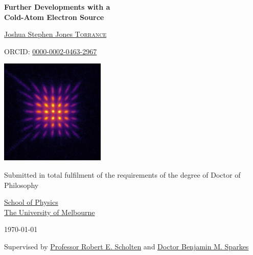 \begin{titlepage}
    \begin{center}
        \vspace*{1cm}
       
        {\huge\textbf{Further Developments with a\\}}
        \vspace{0.2cm}
        {\huge\textbf{Cold-Atom Electron Source}}%
    
        \vspace{1.5cm}
        
        \href{https://scholar.google.com.au/citations?user=sLp309oAAAAJ}{{\huge Joshua Stephen Jones \textsc{Torrance}}}

        \vspace{0.3cm}

        ORCID: \href{http://orcid.org/0000-0002-0463-2967}{0000-0002-0463-2967}
        
        \vfill
        
        \includegraphics[width=5cm]{0frontmatter/example_pepperpot_detector_linear.jpeg}

        \vfill

        Submitted in total fulfilment of the requirements
        of the degree of Doctor of Philosophy

        \vspace{0.4cm}

        \href{http://physics.unimelb.edu.au}{School of Physics\\
           The University of Melbourne}\\
        
        \vspace{0.4cm}
    
        \today

        \vspace{0.4cm}

        Supervised by \href{https://scholar.google.com.au/citations?user=F3QFcRYAAAAJ}{Professor Robert E. Scholten}
        and \href{https://scholar.google.com.au/citations?user=pqsudawAAAAJ}{Doctor Benjamin M. Sparkes}       
    \end{center}
\end{titlepage}